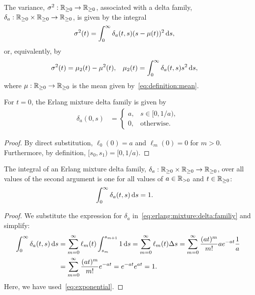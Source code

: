 %
\begin{definition}
	The variance, $\sigma^2: \mathbb{R}_{\geq 0} \rightarrow \mathbb{R}_{\geq 0}$, associated with a delta family, $\delta_a: \mathbb{R}_{\geq 0} \times \mathbb{R}_{\geq 0} \rightarrow \mathbb{R}_{\geq 0}$, is given by the integral
	\begin{align}
		\sigma^2(t) &= \int_0^\infty \delta_a(t, s) (s - \mu(t))^2 \,\mathrm{d} s,
	\end{align}
	or, equivalently, by
	\begin{align}\label{eq:erlang:mixture:delta:family:variance}
		\sigma^2(t) &= \mu_2(t) - \mu^2(t), &
		\mu_2(t) &= \int_0^\infty \delta_a(t, s) s^2 \,\mathrm{d} s,
	\end{align}
	where $\mu: \mathbb{R}_{\geq 0} \rightarrow \mathbb{R}_{\geq 0}$ is the mean given by~\eqref{eq:definition:mean}.
\end{definition}
%
\begin{lemma}\label{lem:erlang:mixture:delta:t:equal:zero}
	For $t = 0$, the Erlang mixture delta family is given by
	\begin{align}
		\delta_a(0, s) &=
		\begin{cases}
			a, & s \in [0, 1/a), \\
			0, & \mathrm{otherwise}.
		\end{cases}
	\end{align}
\end{lemma}
%
\begin{proof}
	By direct substitution, $\ell_0(0) = a$ and $\ell_m(0) = 0$ for $m > 0$. Furthermore, by definition, $[s_0, s_1) = [0, 1/a)$.
\end{proof}
%
\begin{lemma}\label{lem:erlang:mixture:delta:family:integral}
	The integral of an Erlang mixture delta family, $\delta_a: \mathbb{R}_{\geq 0} \times \mathbb{R}_{\geq 0} \rightarrow \mathbb{R}_{\geq 0}$, over all values of the second argument is one for all values of $a \in \mathbb{R}_{> 0}$ and $t \in \mathbb{R}_{\geq 0}$:
	\begin{align}
		\int_0^\infty \delta_a(t, s) \,\mathrm{d} s &= 1.
	\end{align}
\end{lemma}
%
\begin{proof}
	We substitute the expression for $\delta_a$ in~\eqref{eq:erlang:mixture:delta:familiy} and simplify:
	\begin{align}
		\int_0^\infty \delta_a(t, s) \,\mathrm{d} s
		&= \sum_{m=0}^\infty \ell_m(t) \int_{s_m}^{s_{m+1}} 1 \,\mathrm{d} s = \sum_{m=0}^\infty \ell_m(t) \Delta s = \sum_{m=0}^\infty \frac{(at)^m}{m!} a e^{-at} \frac{1}{a} \nonumber \\
		&= \sum_{m=0}^\infty \frac{(at)^m}{m!} e^{-at} = e^{-at} e^{at} = 1.
	\end{align}
	Here, we have used~\eqref{eq:exponential}.
\end{proof}
